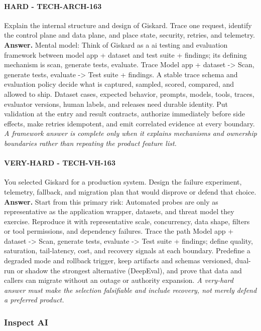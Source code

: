 \paragraph{HARD - TECH-ARCH-163} Explain the internal structure and design of Giskard. Trace one request, identify the control plane and data plane, and place state, security, retries, and telemetry.
\textbf{Answer.} Mental model: Think of Giskard as a ai testing and evaluation framework between model app + dataset and test suite + findings; its defining mechanism is scan, generate tests, evaluate. Trace Model app + dataset -> Scan, generate tests, evaluate -> Test suite + findings. A stable trace schema and evaluation policy decide what is captured, sampled, scored, compared, and allowed to ship. Dataset cases, expected behavior, prompts, models, tools, traces, evaluator versions, human labels, and releases need durable identity. Put validation at the entry and result contracts, authorize immediately before side effects, make retries idempotent, and emit correlated evidence at every boundary.
\textit{A framework answer is complete only when it explains mechanisms and ownership boundaries rather than repeating the product feature list.}
\paragraph{VERY-HARD - TECH-VH-163} You selected Giskard for a production system. Design the failure experiment, telemetry, fallback, and migration plan that would disprove or defend that choice.
\textbf{Answer.} Start from this primary risk: Automated probes are only as representative as the application wrapper, datasets, and threat model they exercise. Reproduce it with representative scale, concurrency, data shape, filters or tool permissions, and dependency failures. Trace the path Model app + dataset -> Scan, generate tests, evaluate -> Test suite + findings; define quality, saturation, tail-latency, cost, and recovery signals at each boundary. Predefine a degraded mode and rollback trigger, keep artifacts and schemas versioned, dual-run or shadow the strongest alternative (DeepEval), and prove that data and callers can migrate without an outage or authority expansion.
\textit{A very-hard answer must make the selection falsifiable and include recovery, not merely defend a preferred product.}
\subsubsection*{Inspect AI}
